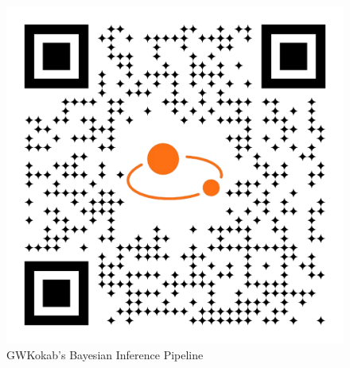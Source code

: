 \documentclass[a0,portrait]{a0poster}
\begin{document}
\begin{figure}[H]
\begin{minipage}{0.2\linewidth}
        \includegraphics[width=\linewidth]{assets/logos/qr-code.pdf}
    \end{minipage}
    \caption{GWKokab's Bayesian Inference Pipeline}
    \label{fig:plate-likelihood}
\end{figure}
\end{document}
